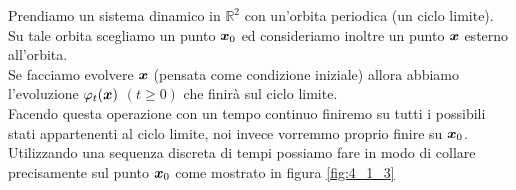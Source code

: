 \begin{exmp}
    Prendiamo un sistema dinamico in $\mathbb{R}^2$ con un'orbita periodica (un ciclo limite).
    Su tale orbita scegliamo un punto $\boldsymbol{x}_0$ ed consideriamo inoltre un punto $\boldsymbol{x}$ esterno all'orbita. \\
    Se facciamo evolvere $\boldsymbol{x}$ (pensata come condizione iniziale) allora abbiamo l'evoluzione $\varphi_t(\boldsymbol{x})$ $(t\ge 0)$ che finirà sul ciclo limite.\\
    Facendo questa operazione con un tempo continuo finiremo su tutti i possibili stati appartenenti al ciclo limite, noi invece vorremmo proprio finire su $\boldsymbol{x}_0$.\\
    Utilizzando una sequenza discreta di tempi possiamo fare in modo di collare precisamente sul punto $\boldsymbol{x}_0$ come mostrato in figura \ref{fig:4_1_3}
\end{exmp}
\noindent
